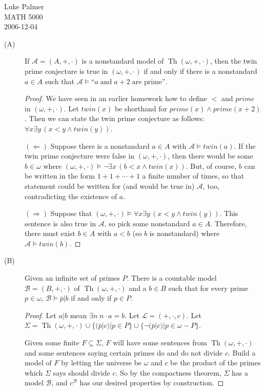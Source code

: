 \documentclass[12pt]{article}
\DeclareMathOperator{\theory}{Th}
\begin{document}
\noindent Luke Palmer \\
MATH 5000 \\
2006-12-04

\begin{description}
\item[(A)] If $\mathcal{A} = (A,+,\cdot)$ is a nonstandard model of
$\theory{(\omega,+,\cdot)}$, then the twin prime conjecture is true in
$(\omega,+,\cdot)$ if and only if there is a nonstandard $a \in A$ such
that $\mathcal{A} \models \text{``}a\;\text{and}\;a+2\;\text{are
prime''}$.
  \begin{proof}
  We have seen in an earlier homework how to define $<$ and
  $\mathit{prime}$ in $(\omega,+,\cdot)$.  Let $\mathit{twin}(x)$ be
  shorthand for $\mathit{prime}(x) \wedge \mathit{prime}(x+2)$.  Then we
  can state the twin prime conjecture as follows: $\forall x \exists
  y\,(x < y \wedge \mathit{twin}(y))$.

  $(\Leftarrow)$  Suppose there is a nonstandard $a \in A$ with
  $\mathcal{A} \models \mathit{twin}(a)$.  If the twin prime conjecture
  were false in $(\omega,+,\cdot)$, then there would be some $b \in
  \omega$ where $(\omega,+,\cdot) \models \neg \exists x\,(b < x \wedge
  \mathit{twin}(x))$.  But, of course, $b$ can be written in the form
  $1+1+\cdots+1$ a finite number of times, so that statement could be
  written for (and would be true in) $\mathcal{A}$, too, contradicting
  the existence of $a$.

  $(\Rightarrow)$  Suppose that $(\omega,+,\cdot) \models \forall x
  \exists y\,(x < y \wedge \mathit{twin}(y))$.  This sentence is also
  true in $\mathcal{A}$, so pick some nonstandard $a \in A$.  Therefore,
  there must exist $b \in A$ with $a < b$ (so $b$ is nonstandard) where
  $\mathcal{A} \models \mathit{twin}(b)$.
  \end{proof}

\item[(B)] Given an infinite set of primes $P$.  There is a countable
model $\mathcal{B} = (B,+,\cdot)$ of $\theory{(\omega,+,\cdot)}$ and a
$b \in B$ such that for every prime $p \in \omega$, $\mathcal{B} \models
\bar{p}|b$ if and only if $p \in P$.
  \begin{proof}
  Let $a|b$ mean $\exists n \; n \cdot a = b$.  Let $\mathcal{L} =
  (+,\cdot,c)$.  Let $\Sigma = \theory{(\omega,+,\cdot)} \cup \{
  (\bar{p}|c) | p \in P \} \cup \{ \neg(\bar{p}|c) | p \in \omega - P
  \}$.

  Given some finite $F \subseteq \Sigma$, $F$ will have some sentences
  from $\theory{(\omega,+,\cdot)}$ and some sentences saying certain
  primes do and do not divide $c$.  Build a model of $F$ by letting the
  universe be $\omega$ and $c$ be the product of the primes which
  $\Sigma$ says should divide $c$.  So by the compactness theorem,
  $\Sigma$ has a model $\mathcal{B}$, and $c^\mathcal{B}$ has our desired
  properties by construction.
  \end{proof}


\end{description}
\end{document}
